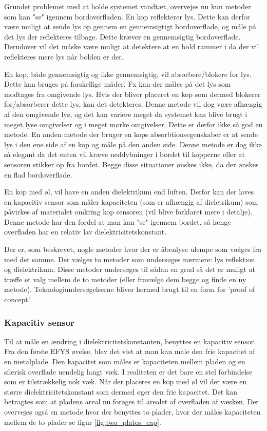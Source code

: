 \documentclass[HardwareDesign/HardwareDesign_main.tex]{subfiles}
\begin{document}
Grundet problemet med at holde systemet vandtæt, overvejes nu kun metoder som kan "se"  igennem bordoverfladen. En kop reflekterer lys. Dette kan derfor være muligt at sende lys op gennem en gennemsigtigt bordoverflade, og måle på det lys der reflekteres tilbage. Dette kræver en gennemsigtig bordoverflade. Derudover vil det måske være muligt at detektere at en bold rammer i da der vil reflekteres mere lys når bolden er der.

En kop, både gennemsigtig og ikke gennemsigtig, vil absorbere/blokere for lys. Dette kan bruges på forskellige måder. Fx kan der måles på det lys som modtages fra omgivende lys. Hvis der bliver placeret en kop som dermed blokerer for/absorberer dette lys, kan det detekteres. Denne metode vil dog være afhængig af den omgivende lys, og det kan variere meget da systemet kan blive brugt i meget lyse omgivelser og i meget mørke omgivelser. Dette er derfor ikke så god en metode. En anden metode der bruger en kops absorbtionsegenskaber er at sende lys i den ene side af en kop og måle på den anden side.  Denne metode er dog ikke så elegant da det enten vil kræve neddybninger i bordet til kopperne eller at sensoren stikker op fra bordet. Begge disse situationer ønskes ikke, da der ønskes en flad bordoverflade.

En kop med øl, vil have en anden dielektrikum end luften. Derfor kan der laves en kapacitiv sensor som måler kapaciteten (som er afhængig af dieletrikum) som påvirkes af materialet omkring kop sensoren (vil blive forklaret mere i detalje). Denne metode har den fordel at man kan "se" igennem bordet, så længe overfladen har en relativ lav dielektricitetskonstant.

Der er, som beskrevet, nogle metoder hvor der er åbenlyse ulempe som vælges fra med det samme. Der vælges to metoder som undersøges nærmere: lys reflektion og dielektrikum. Disse metoder undersøges til sådan en grad så det er muligt at træffe et valg mellem de to metoder (eller fravælge dem begge og finde en ny metode). Teknologiundersøgelserne bliver hermed brugt til en form for 'proof of concept'.  

\subsubsection{Kapacitiv sensor}
Til at måle en ændring i dielektricitetskonstanten, benyttes en kapacitiv sensor. Fra den første EFYS øvelse, blev det vist at man kan male den frie kapacitet af en metalplade. Den kapacitet som måles er kapaciteten mellem pladen og en sfærisk overflade uendelig langt væk. I realiteten er det bare en stel forbindelse som er tilstrækkelig nok væk. Når der placeres en kop med øl vil der være en større dielektricitetskonstant som dermed øger den frie kapacitet. Det kan betragtes som at pladens areal nu forøges til arealet af overfladen af væsken. Der overvejes også en metode hvor der benyttes to plader, hvor der måles kapaciteten mellem de to plader se figur \ref{fig:two_plates_cap}.
\end{document}
